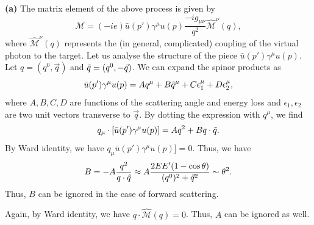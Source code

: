\documentclass[11pt]{article}
\theoremstyle{definition}
\begin{document}
\textbf{(a)} The matrix element of the above process is given by
\begin{equation}
    \mathcal{M} = (-ie)\bar{u}(p')\gamma^\mu u(p)\frac{-ig_{\mu\nu}}{q^2}\hat{\mathcal{M}}^\nu(q),
\end{equation}
where $\hat{\mathcal{M}}^\nu(q)$ represents the (in general, complicated) coupling of the virtual photon to the target. Let us analyse the structure of the piece $\bar{u}(p')\gamma^\mu u(p)$. Let $q = (q^0,\vec{q})$ and $\Tilde{q}=(q^0,-\vec{q})$. We can expand the spinor products as 
\begin{equation}
    \bar{u}(p')\gamma^\mu u(p) = Aq^\mu + B\Tilde{q}^\mu + C \epsilon_1^\mu + D\epsilon_2^\mu,
\end{equation}
where $A, B, C , D$ are functions of the scattering angle and energy loss and $\epsilon_1, \epsilon_2$ are two unit vectors transverse to $\vec{q}$. By dotting the expression with $q^\mu$, we find
\begin{equation}
    q_\mu \cdot [\bar{u}(p')\gamma^\mu u(p)] = Aq^2 + Bq\cdot \Tilde{q}.
\end{equation}
By Ward identity, we have $q_\mu \bar{u}(p')\gamma^\mu u(p)]=0$. Thus, we have
\begin{equation}
    B = -A\frac{q^2}{q\cdot \Tilde{q}} \approx A \frac{2EE'(1-\cos\theta)}{(q^0)^2 + \vec{q}^2} \sim \theta^2.
\end{equation}
Thus, $B$ can be ignored in the case of forward scattering.

Again, by Ward identity, we have $q\cdot \hat{\mathcal{M}}(q) = 0$. Thus, $A$ can be ignored as well.
\end{document}
